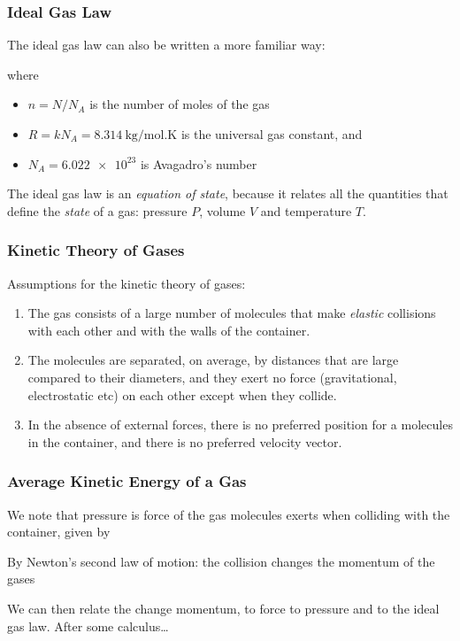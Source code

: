 \documentclass[12pt,aspectratio=169]{beamer}
\newcommand{\mb}[1]{\mathbf{#1}}
\newcommand{\eq}[2]{\vspace{#1}{\Large\begin{displaymath}#2\end{displaymath}}}
\begin{document}
\begin{frame}
  \frametitle{Ideal Gas Law}
  The ideal gas law can also be written a more familiar way:
  
  \eq{-.2in}{
    \boxed{PV=nRT}
  }

  \vspace{-.25in}where
  \begin{itemize}
  \item $n=N/N_A$ is the number of moles of the gas
  \item $R=kN_A=\SI{8.314}{\kilo\gram/\mol.\kelvin}$ is the universal gas
    constant, and
  \item $N_A=\num{6.022e23}$ is Avagadro's number
  \end{itemize}

  \vspace{.1in}The ideal gas law is an \emph{equation of state}, because it
  relates all the quantities that define the \emph{state} of a gas: pressure
  $P$, volume $V$ and temperature $T$.
\end{frame}


\begin{frame}
  \frametitle{Kinetic Theory of Gases}
  Assumptions for the kinetic theory of gases:
  \begin{enumerate}
  \item The gas consists of a large number of molecules that make
    \emph{elastic} collisions with each other and with the walls of the
    container.
  \item The molecules are separated, on average, by distances that are large
    compared to their diameters, and they exert no force (gravitational,
    electrostatic etc) on each other except when they collide.\footnotemark
  \item In the absence of external forces, there is no preferred position for a
    molecules in the container, and there is no preferred velocity vector.
  \end{enumerate}

\end{frame}


\begin{frame}
  \frametitle{Average Kinetic Energy of a Gas}
  We note that pressure is force of the gas molecules exerts when colliding
  with the container, given by

  \eq{-.3in}{ P=\frac{F}{A} }

  By Newton's second law of motion: the collision changes the momentum of the
  gases

  \eq{-.3in}{ \mb{F}=\frac{d\mb{p}}{dt} }

  We can then relate the change momentum, to force to pressure and to the ideal
  gas law. After some calculus\ldots
\end{frame}
\end{document}
